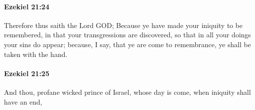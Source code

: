 		\paragraph{Ezekiel 21:24} %
			\label{EZEKIEL-21-24}

			Therefore thus saith the Lord GOD; Because ye have made your iniquity to be remembered, in that your transgressions are discovered, so that in all your doings your sins do appear; because, I say, that ye are come to remembrance, ye shall be taken with the hand.


		\paragraph{Ezekiel 21:25} %
			\label{EZEKIEL-21-25}

			And thou, profane wicked prince of Israel, whose day is come, when iniquity shall have an end,


